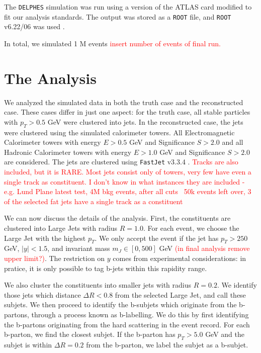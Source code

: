 \documentclass[10pt,a4paper]{book}
\newcommand\todo[1]{\textcolor{red}{#1}}
\def\code#1{\texttt{#1}}
\begin{document}
The \code{DELPHES} simulation was run using a version of the ATLAS card modified to fit our analysis standards. The output was stored as a \code{ROOT} file, and \code{ROOT} v6.22/06 was used \cite{fons_rademakers_2020_3895852}. 

In total, we simulated 1 M events \todo{insert number of events of final run.}


\section{The Analysis}

We analyzed the simulated data in both the truth case and the reconstructed case. These cases differ in just one aspect: for the truth case, all stable particles with $p_T > 0.5$ GeV were clustered into jets. In the reconstructed case, the jets were clustered using the simulated calorimeter towers. All Electromagnetic Calorimeter towers with energy $E > 0.5$ GeV and Significance $S > 2.0$ and all Hadronic Calorimeter towers with energy $E > 1.0$ GeV and Significance $S > 2.0$ are considered. The jets are clustered using \code{FastJet} v3.3.4 \cite{Cacciari:2011ma}.
\todo{Tracks are also included, but it is RARE. Most jets consist only of towers, very few have even a single track as constituent. I don't know in what instances they are included - e.g. Lund Plane latest test, 4M bkg events, after all cuts ~50k events left over, 3 of the selected fat jets have a single track as a constituent}

We can now discuss the details of the analysis. First, the constituents are clustered into Large Jets with radius $R=1.0$.  For  each  event,  we  choose  the  Large  Jet  with  the highest $p_T$. We only accept the event if the jet has $p_T > 250$ GeV, $\vert y \vert < 1.5$, and invariant mass $m_J \in [0,500]$ GeV \todo{(in final analysis remove upper limit?)}. The restriction on $y$ comes from experimental considerations: in pratice, it is only possible to tag b-jets within this rapidity range.

We  also  cluster  the  constituents  into  smaller  jets with radius $R = 0.2$. We identify those jets which distance $\Delta R < 0.8$ from the selected Large Jet, and call these subjets. We then proceed to identify the b-subjets which originate from the b-partons, through a process known as b-labelling. We do this by first identifying the b-partons originating from the hard scattering in the event record. For each b-parton, we find the closest subjet. If the b-parton has $p_T > 5.0$ GeV and the subjet is within $\Delta R = 0.2$ from the b-parton, we label the subjet as a b-subjet. 
\end{document}
